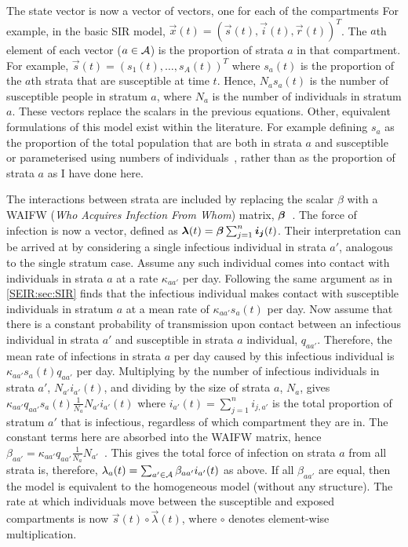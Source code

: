 \documentclass[thesis.tex]{subfiles}
\begin{document}
The state vector is now a vector of vectors, one for each of the compartments
For example, in the basic SIR model, $\vec{x}(t) = (\vec{s}(t), \vec{i}(t), \vec{r}(t))^T$.
The $a$th element of each vector ($a \in \mathcal{A}$) is the proportion of strata $a$ in that compartment.
For example, $\vec{s}(t) = (s_1(t), \dots, s_A(t))^T$ where $s_a(t)$ is the proportion of the $a$th strata that are susceptible at time $t$.
Hence, $N_a s_a(t)$ is the number of susceptible people in stratum $a$, where $N_a$ is the number of individuals in stratum $a$.
These vectors replace the scalars in the previous equations.
Other, equivalent formulations of this model exist within the literature.
For example defining $s_a$ as the proportion of the total population that are both in strata $a$ and susceptible or parameterised using numbers of individuals~\autocite[57]{keelingModeling}, rather than as the proportion of strata $a$ as I have done here.

The interactions between strata are included by replacing the scalar $\beta$ with a WAIFW (\emph{Who Acquires Infection From Whom}) matrix, $\bm{\beta}$~\autocite[58]{keelingModeling}.
The force of infection is now a vector, defined as $\bm\lambda(t) = \bm{\beta} \sum_{j=1}^n \bm{i_j}(t)$.
Their interpretation can be arrived at by considering a single infectious individual in strata $a'$, analogous to the single stratum case.
Assume any such individual comes into contact with individuals in strata $a$ at a rate $\kappa_{aa'}$ per day.
Following the same argument as in \cref{SEIR:sec:SIR} finds that the infectious individual makes contact with susceptible individuals in stratum $a$ at a mean rate of $\kappa_{aa'} s_a(t)$ per day.
Now assume that there is a constant probability of transmission upon contact between an infectious individual in strata $a'$ and susceptible in strata $a$ individual, $q_{aa'}$.
Therefore, the mean rate of infections in strata $a$ per day caused by this infectious individual is $\kappa_{aa'} s_a(t) q_{aa'}$ per day.
Multiplying by the number of infectious individuals in strata $a'$, $N_{a'} i_{a'}(t)$, and dividing by the size of strata $a$, $N_a$, gives $\kappa_{aa'} q_{aa'} s_a(t) \frac{1}{N_a} N_{a'} i_{a'}(t)$ where $i_{a'}(t) = \sum_{j=1}^n i_{j,a'}$ is the total proportion of stratum $a'$ that is infectious, regardless of which compartment they are in.
The constant terms here are absorbed into the WAIFW matrix, hence $\beta_{aa'} = \kappa_{aa'} q_{aa'} \frac{1}{N_a} N_{a'}$~\autocite[section 9.2]{diekmannMathematical}.
This gives the total force of infection on strata $a$ from all strata is, therefore, $\lambda_a(t) = \sum_{a' \in \mathcal{A}} \beta_{aa'} i_{a'}(t)$ as above.
If all $\beta_{aa'}$ are equal, then the model is equivalent to the homogeneous model (\ie without any structure).
The rate at which individuals move between the susceptible and exposed compartments is now $\vec{s}(t) \circ \vec\lambda(t)$, where $\circ$ denotes element-wise multiplication.
\end{document}
